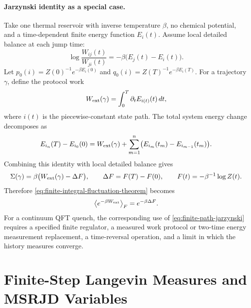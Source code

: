 \paragraph{Jarzynski identity as a special case.}
Take one thermal reservoir with inverse temperature \(\beta\), no chemical
potential, and a time-dependent finite energy function \(E_i(t)\).  Assume
local detailed balance at each jump time:
\[
  \log\frac{W_{ij}(t)}{W_{ji}(t)}
  =
  -\beta\bigl(E_j(t)-E_i(t)\bigr).
\]
Let \(p_0(i)=Z(0)^{-1}e^{-\beta E_i(0)}\) and
\(q_0(i)=Z(T)^{-1}e^{-\beta E_i(T)}\).  For a trajectory \(\gamma\), define
the protocol work
\begin{equation}
  W_{\rm ext}(\gamma)
  =
  \int_0^T \partial_tE_{i(t)}(t)\,dt,
  \label{eq:finite-path-protocol-work}
\end{equation}
where \(i(t)\) is the piecewise-constant state path.  The total system
energy change decomposes as
\[
  E_{i_n}(T)-E_{i_0}(0)
  =
  W_{\rm ext}(\gamma)
  +
  \sum_{m=1}^n
  \bigl(E_{i_m}(t_m)-E_{i_{m-1}}(t_m)\bigr).
\]
Combining this identity with local detailed balance gives
\[
  \Sigma(\gamma)
  =
  \beta\bigl(W_{\rm ext}(\gamma)-\Delta F\bigr),
  \qquad
  \Delta F=F(T)-F(0),
  \qquad
  F(t)=-\beta^{-1}\log Z(t).
\]
Therefore \eqref{eq:finite-integral-fluctuation-theorem} becomes
\begin{equation}
  \left\langle e^{-\beta W_{\rm ext}}\right\rangle_F
  =
  e^{-\beta\Delta F}.
  \label{eq:finite-path-jarzynski}
\end{equation}
For a continuum QFT quench, the corresponding use of
\eqref{eq:finite-path-jarzynski} requires a specified finite regulator, a
measured work protocol or two-time energy measurement replacement, a
time-reversal operation, and a limit in which the history measures converge.

\section{Finite-Step Langevin Measures and MSRJD Variables}
\label{sec:finite-step-langevin-msrjd}

